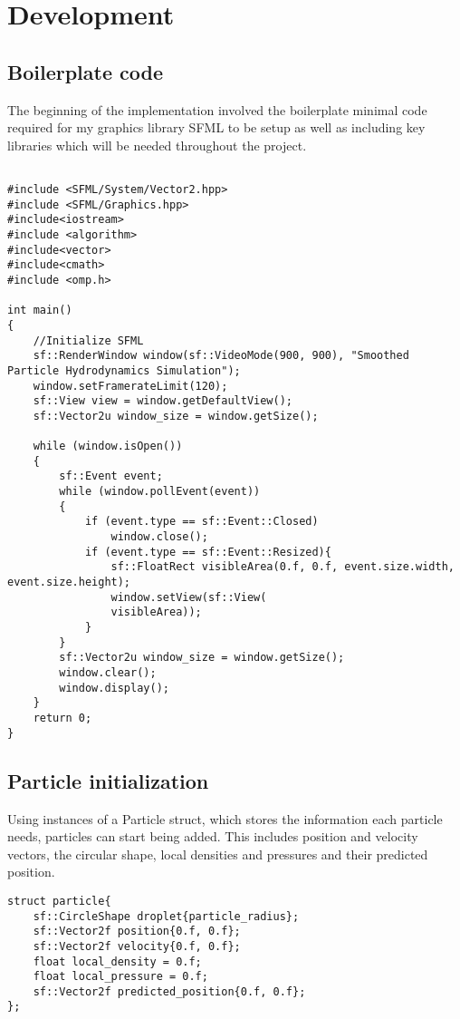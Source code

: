 \documentclass[write-up.tex]{subfiles}
\begin{document}
\section{Development}
\subsection{Boilerplate code}

The beginning of the implementation involved the boilerplate minimal code required for my graphics library SFML to be setup as well as including key libraries which will be needed throughout the project.
\begin{lstlisting}

#include <SFML/System/Vector2.hpp>
#include <SFML/Graphics.hpp>
#include<iostream>
#include <algorithm>
#include<vector>
#include<cmath>
#include <omp.h>

int main()
{
    //Initialize SFML
    sf::RenderWindow window(sf::VideoMode(900, 900), "Smoothed Particle Hydrodynamics Simulation");
    window.setFramerateLimit(120);
    sf::View view = window.getDefaultView();
    sf::Vector2u window_size = window.getSize();

    while (window.isOpen())
    {
        sf::Event event;
        while (window.pollEvent(event))
        {
            if (event.type == sf::Event::Closed)
                window.close();
            if (event.type == sf::Event::Resized){
                sf::FloatRect visibleArea(0.f, 0.f, event.size.width, event.size.height);
                window.setView(sf::View(
                visibleArea));
            }
        }
        sf::Vector2u window_size = window.getSize();
        window.clear();
        window.display();
    }
    return 0;
}
\end{lstlisting}

\subsection{Particle initialization}
Using instances of a Particle struct, which stores the information each particle needs, particles can start being added. This includes position and velocity vectors, the circular shape, local densities and pressures and their predicted position.

\begin{lstlisting}
struct particle{
    sf::CircleShape droplet{particle_radius};
    sf::Vector2f position{0.f, 0.f};
    sf::Vector2f velocity{0.f, 0.f};
    float local_density = 0.f;
    float local_pressure = 0.f;
    sf::Vector2f predicted_position{0.f, 0.f};
};
\end{lstlisting}
\end{document}
